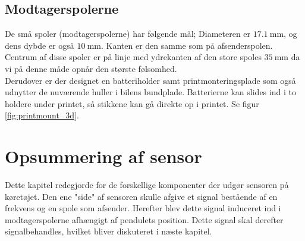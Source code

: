 \subsection{Modtagerspolerne}
De små spoler (modtagerspolerne) har følgende mål; 
Diameteren er $\SI{17.1}{\milli\meter}$, og dens dybde er også $\SI{10}{\milli\meter}$. Kanten er den samme som på afsenderspolen. Centrum af disse spoler er på linje med ydrekanten af den store spoles $\SI{35}{\milli\meter}$ da vi på denne måde opnår den største følsomhed. \\

Derudover er der designet en batteriholder samt printmonteringsplade som også udnytter de nuværende huller i bilens bundplade. Batterierne kan slides ind i to holdere under printet, så stikkene kan gå direkte op i printet. Se figur \ref{fig:printmount_3d}.\\

\section{Opsummering af sensor}
Dette kapitel redegjorde for de forskellige komponenter der udgør sensoren på køretøjet. Den ene "side" af sensoren skulle afgive et signal bestående af en frekvens og en spole som afsender. Herefter blev dette signal induceret ind i modtagerspolerne afhængigt af pendulets position. Dette signal skal derefter signalbehandles, hvilket bliver diskuteret i næste kapitel. 